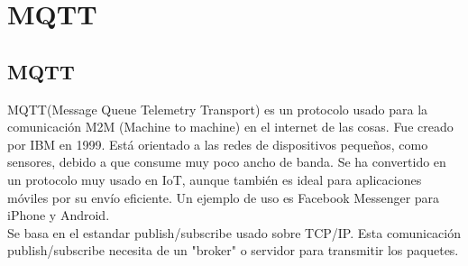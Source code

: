 \documentclass[12pt, twoside]{book}
\begin{document}
\chapter{MQTT}

\section{MQTT}
MQTT(Message Queue Telemetry Transport) es un protocolo usado para la comunicación M2M (Machine to machine) en el internet de las cosas. Fue creado por IBM en 1999. Está orientado a las redes de dispositivos pequeños, como sensores, debido a que consume muy poco ancho de banda. Se ha convertido en un protocolo muy usado en IoT, aunque también es ideal para aplicaciones móviles por su envío eficiente. Un ejemplo de uso es Facebook Messenger para iPhone y Android.\\
Se basa en el estandar publish/subscribe usado sobre TCP/IP. Esta comunicación publish/subscribe necesita de un "broker" o servidor para transmitir los paquetes.
\end{document}
